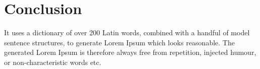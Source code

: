 \documentclass[../main.tex]{subfiles}
\begin{document}
 
\chapter{Conclusion}
 It uses a dictionary of over 200 Latin words, combined with a handful of model sentence structures, to generate Lorem Ipsum which looks reasonable. The generated Lorem Ipsum is therefore always free from repetition, injected humour, or non-characteristic words etc.
 
\end{document}
